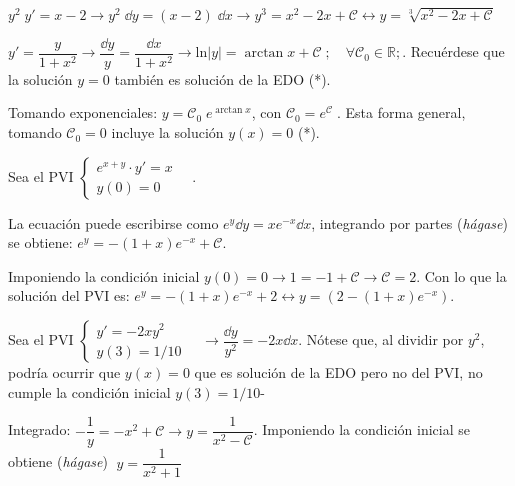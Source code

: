 \begin{cuadro-gris}
\begin{ejem}
$y^2\; y'=x-2 \to y^2\; \dd y = (x-2) \; \dd x \to y^3=x^2-2x+\mathcal C \leftrightarrow y=\sqrt[3]{x^2-2x+\mathcal C}$	
\end{ejem}
\end{cuadro-gris}

\begin{cuadro-gris}
\begin{ejem}
$y'=\dfrac {y}{1+x^2} \to \dfrac {\dd y}{y} = \dfrac {\dd x}{1 + x^2} \to \mathrm{ln}|y|=\arctan x + \mathcal C\; ; \quad  \forall \mathcal C_0 \in \mathbb R; $.
Recuérdese que la solución $y=0$ también es solución de la EDO (*).

Tomando exponenciales: $y=\mathcal C_0\; e^{\arctan x}$, con $ 	\mathcal C_0=e^{\mathcal C} \;$. Esta forma general, tomando $\mathcal C_0=0$ incluye la solución $y(x)=0$ (*). 
\end{ejem}
\end{cuadro-gris}

\begin{cuadro-gris}
\begin{ejem}
Sea el PVI $\begin{cases} e^{x+y} \cdot  y'= x \\ y(0)=0 \end{cases}\quad$. 

La ecuación puede escribirse como $e^y\dd y=xe^{-x}\dd x$, integrando por partes (\emph{hágase}) se obtiene: $e^y=-(1+x)e^{-x}+\mathcal C$.

Imponiendo la condición inicial $y(0)=0 \to 1=-1+\mathcal C \to \mathcal C=2$. Con lo que la solución del PVI es: $e^y=-(1+x)e^{-x}+2 \leftrightarrow y=\left(2-(1+x)e^{-x}\right)$.
	
\end{ejem}
\end{cuadro-gris}

\begin{cuadro-gris}
\begin{ejem}
Sea el PVI $\begin{cases}  y'= -2x y^2 \\ y(3)=1/10 \end{cases}\quad \to \dfrac {\dd y}{y^2}=-2x \dd x $. Nótese que, al dividir por $y^2$, podría ocurrir que $y(x)=0$ que es solución de la EDO pero no del PVI, no cumple la condición inicial $y(3)=1/10$-

Integrado: $-\dfrac 1 y = -x^2+\mathcal C \to y=\dfrac {1}{x^2 - \mathcal C}$. Imponiendo la condición inicial se obtiene (\emph{hágase}) $\; y=\dfrac {1}{x^2 + 1}$
\end{ejem}
\end{cuadro-gris}

